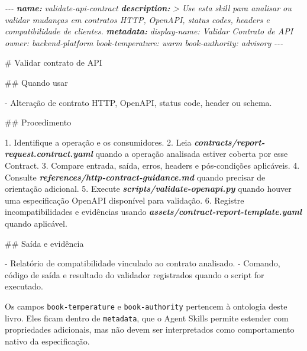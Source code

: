 \documentclass[
  10pt,
  a4paper,
  oneside]{book}
\newenvironment{Shaded}{}{}
\newcommand{\AnnotationTok}[1]{\textcolor[rgb]{0.38,0.63,0.69}{\textbf{\textit{#1}}}}
\newcommand{\CommentTok}[1]{\textcolor[rgb]{0.38,0.63,0.69}{\textit{#1}}}
\newcommand{\FunctionTok}[1]{\textcolor[rgb]{0.02,0.16,0.49}{#1}}
\newcommand{\InformationTok}[1]{\textcolor[rgb]{0.38,0.63,0.69}{\textbf{\textit{#1}}}}
\newcommand{\NormalTok}[1]{#1}
\newcommand{\SpecialStringTok}[1]{\textcolor[rgb]{0.73,0.40,0.53}{#1}}
\renewenvironment{Shaded}{\begin{snugshade}}{\end{snugshade}}%
\begin{document}
\begin{Shaded}
\begin{Highlighting}[]
\CommentTok{{-}{-}{-}}
\AnnotationTok{name:}\CommentTok{ validate{-}api{-}contract}
\AnnotationTok{description:}\CommentTok{ \textgreater{}}
\CommentTok{  Use esta skill para analisar ou validar mudanças em contratos HTTP,}
\CommentTok{  OpenAPI, status codes, headers e compatibilidade de clientes.}
\AnnotationTok{metadata:}
\CommentTok{  display{-}name: Validar Contrato de API}
\CommentTok{  owner: backend{-}platform}
\CommentTok{  book{-}temperature: warm}
\CommentTok{  book{-}authority: advisory}
\CommentTok{{-}{-}{-}}

\FunctionTok{\# Validar contrato de API}

\FunctionTok{\#\# Quando usar}

\SpecialStringTok{{-} }\NormalTok{Alteração de contrato HTTP, OpenAPI, status code, header ou schema.}

\FunctionTok{\#\# Procedimento}

\SpecialStringTok{1. }\NormalTok{Identifique a operação e os consumidores.}
\SpecialStringTok{2. }\NormalTok{Leia }\InformationTok{\textasciigrave{}contracts/report{-}request.contract.yaml\textasciigrave{}}\NormalTok{ quando a operação analisada estiver coberta por esse Contract.}
\SpecialStringTok{3. }\NormalTok{Compare entrada, saída, erros, headers e pós{-}condições aplicáveis.}
\SpecialStringTok{4. }\NormalTok{Consulte }\InformationTok{\textasciigrave{}references/http{-}contract{-}guidance.md\textasciigrave{}}\NormalTok{ quando precisar de orientação adicional.}
\SpecialStringTok{5. }\NormalTok{Execute }\InformationTok{\textasciigrave{}scripts/validate{-}openapi.py\textasciigrave{}}\NormalTok{ quando houver uma especificação OpenAPI disponível para validação.}
\SpecialStringTok{6. }\NormalTok{Registre incompatibilidades e evidências usando }\InformationTok{\textasciigrave{}assets/contract{-}report{-}template.yaml\textasciigrave{}}\NormalTok{ quando aplicável.}

\FunctionTok{\#\# Saída e evidência}

\SpecialStringTok{{-} }\NormalTok{Relatório de compatibilidade vinculado ao contrato analisado.}
\SpecialStringTok{{-} }\NormalTok{Comando, código de saída e resultado do validador registrados quando o script for executado.}
\end{Highlighting}
\end{Shaded}

Os campos \texttt{book-temperature} e \texttt{book-authority} pertencem
à ontologia deste livro. Eles ficam dentro de \texttt{metadata}, que o
Agent Skills permite estender com propriedades adicionais, mas não devem
ser interpretados como comportamento nativo da especificação.
\end{document}

